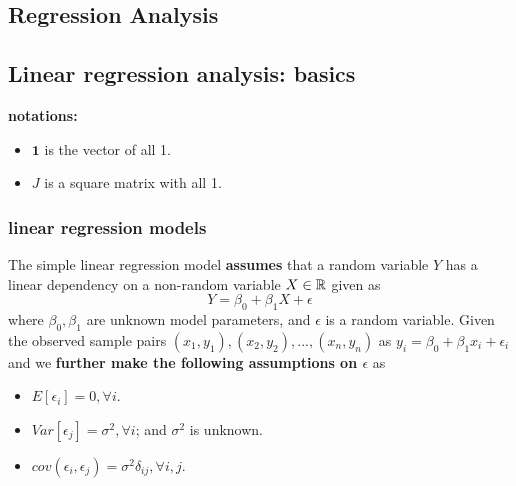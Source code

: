 
\begin{refsection}
	\startcontents[chapters]	

\chapter{Regression Analysis}\label{ch:regression-analysis}


\section{Linear regression analysis: basics}\label{ch:theory-of-statistics:sec:linear-regression-analysis}
\begin{mdframed}
	\textbf{notations:}
	\begin{itemize}
		\item $\bm{1}$ is the vector of all 1.
		\item $J$ is a square matrix with all 1.
	\end{itemize}
\end{mdframed}


\subsection{linear regression models}
\begin{definition}
	The simple linear regression model \textbf{assumes} that a random variable $Y$ has a linear dependency on a non-random variable $X \in \mathbb{R}$ given as
	$$Y = \beta_0 + \beta_1 X + \epsilon$$
	where $\beta_0,\beta_1$ are unknown model parameters, and $\epsilon$ is a random variable. 
	Given the observed sample pairs $(x_1,y_1),(x_2,y_2),..., (x_n,y_n)$ as $y_i = \beta_0 + \beta_1 x_i + \epsilon_i$ and we \textbf{further make the following assumptions on $\epsilon$} as
	\begin{itemize}
		\item $E[\epsilon_i] = 0,\forall i$.
		\item $Var[\epsilon_j] = \sigma^2,\forall i$; and $\sigma^2$ is unknown.
		\item $cov(\epsilon_i,\epsilon_j) =\sigma^2 \delta_{ij},\forall i,j$.
	\end{itemize} 	
\end{definition}



\end{refsection}
